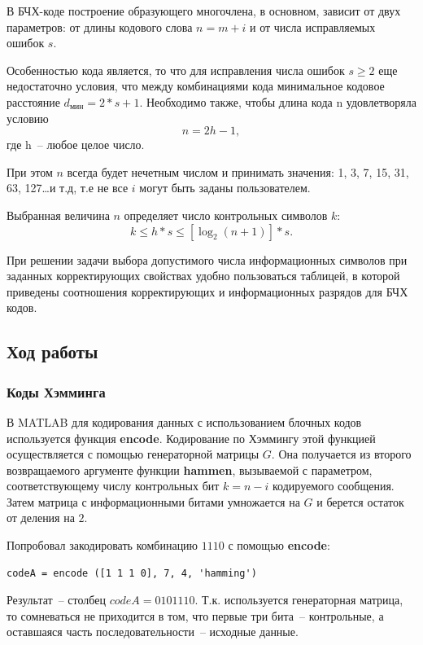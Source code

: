 \documentclass[12pt,a4paper]{article}
\begin{document}
  В БЧХ-коде построение образующего многочлена, в основном, зависит от двух параметров: от длины кодового слова $n=m+i$ и от числа исправляемых ошибок $s$.
  
  Особенностью кода является,   то что  для исправления числа ошибок $s\geq 2$ еще недостаточно условия, что между комбинациями кода минимальное кодовое расстояние $d_\text{мин}=2*s+1$. Необходимо также, чтобы длина кода n удовлетворяла условию
  \begin{equation} \label{eq:bch_usl1}
    n = 2h - 1,
  \end{equation}
  где h~-- любое целое число.
  
  При этом $n$ всегда будет нечетным числом и принимать значения: 1, 3, 7, 15, 31, 63, 127\ldots и т.д, т.е не все $i$ могут быть заданы пользователем. 

  Выбранная величина $n$ определяет число контрольных символов $k$:
  \begin{equation} \label{eq:bch_usl2}
    k\leq h*s\leq [\log_2 (n+1)]*s\text{.}
  \end{equation}
    
  При решении задачи выбора допустимого числа информационных символов при заданных корректирующих свойствах удобно пользоваться таблицей, в которой приведены соотношения корректирующих и информационных разрядов для БЧХ кодов.
  
  
\subsection{Ход работы}
  
\subsubsection{Коды Хэмминга}
  
  В MATLAB для кодирования данных с использованием блочных кодов используется функция \textbf{encode}. Кодирование по Хэммингу этой функцией осуществляется с помощью генераторной матрицы $G$. Она получается из второго возвращаемого аргументе функции \textbf{hammen}, вызываемой с параметром, соответствующему числу контрольных бит $k=n-i$ кодируемого сообщения. Затем матрица с информационными битами умножается на $G$ и берется остаток от деления на $2$.
  
  Попробовал закодировать комбинацию $1110$ с помощью \textbf{encode}:
  \begin{lstlisting}
codeA = encode ([1 1 1 0], 7, 4, 'hamming')
  \end{lstlisting}
  Результат~-- столбец $codeA=0101110$. Т.к. используется генераторная матрица, то сомневаться не приходится в том, что первые три бита~-- контрольные, а оставшаяся часть последовательности~-- исходные данные.
  
\end{document}
